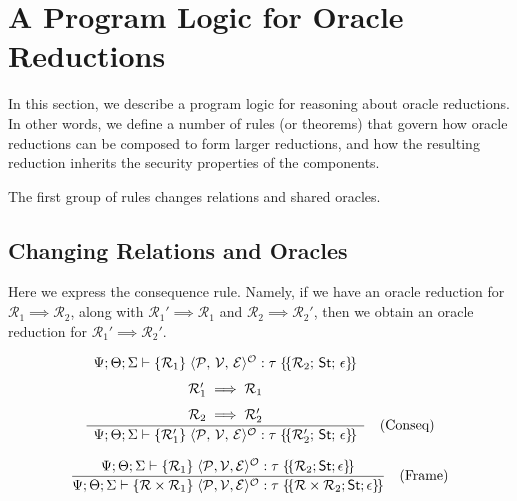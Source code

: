 \section{A Program Logic for Oracle Reductions}

In this section, we describe a program logic for reasoning about oracle reductions. In other words, we define a number of rules (or theorems) that govern how oracle reductions can be composed to form larger reductions, and how the resulting reduction inherits the security properties of the components.

The first group of rules changes relations and shared oracles.

\subsection{Changing Relations and Oracles}

Here we express the consequence rule.  Namely, if we have an oracle reduction for 
\(\mathcal{R}_1 \implies \mathcal{R}_2\), along with 
\(\mathcal{R}_1' \implies \mathcal{R}_1\) and \(\mathcal{R}_2 \implies \mathcal{R}_2'\),
then we obtain an oracle reduction for \(\mathcal{R}_1' \implies \mathcal{R}_2'\).

\[
\frac{%
  \begin{array}{c}
    \Psi; \Theta; \Sigma \vdash \{\mathcal{R}_1\}\; \langle \mathcal{P},\, \mathcal{V},\, \mathcal{E}\rangle^{\mathcal{O}} : \tau \;\{\!\{\mathcal{R}_2; \,\mathsf{St};\, \epsilon\}\!\} \\[1.5ex]
    \mathcal{R}_1' \implies \mathcal{R}_1 \\[1.5ex]
    \mathcal{R}_2 \implies \mathcal{R}_2'
  \end{array}%
}{%
  \Psi; \Theta; \Sigma \vdash \{\mathcal{R}_1'\}\; \langle \mathcal{P},\, \mathcal{V},\, \mathcal{E}\rangle^{\mathcal{O}} : \tau \;\{\!\{\mathcal{R}_2'; \,\mathsf{St};\, \epsilon\}\!\}
} \quad \text{(Conseq)}
\]


\[
\frac{%
  \Psi; \Theta; \Sigma \vdash \{\mathcal{R}_1\} \; \langle\mathcal{P}, \mathcal{V}, \mathcal{E}\rangle^{\mathcal{O}} : \tau \; \{\!\{\mathcal{R}_2; \mathsf{St}; \epsilon\}\!\}
}{%
  \Psi; \Theta; \Sigma \vdash \{\mathcal{R} \times \mathcal{R}_1\} \; \langle\mathcal{P}, \mathcal{V}, \mathcal{E}\rangle^{\mathcal{O}} : \tau \; \{\!\{\mathcal{R} \times \mathcal{R}_2; \mathsf{St}; \epsilon\}\!\}
} \quad \text{(Frame)}
\]

